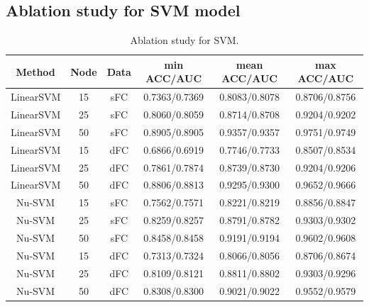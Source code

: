 \documentclass[11pt]{article}
\begin{document}
\subsection{Ablation study for SVM model}

\begin{table}[H]
    \centering
    \begin{tabular}{|c|c|c|c|c|c|}
        \hline
        Method    & Node & Data & min ACC/AUC   & mean ACC/AUC  & max ACC/AUC   \\
        \hline
        LinearSVM & 15   & sFC  & 0.7363/0.7369 & 0.8083/0.8078 & 0.8706/0.8756 \\
        \hline
        LinearSVM & 25   & sFC  & 0.8060/0.8059 & 0.8714/0.8708 & 0.9204/0.9202 \\
        \hline
        LinearSVM & 50   & sFC  & 0.8905/0.8905 & 0.9357/0.9357 & 0.9751/0.9749 \\
        \hline
        LinearSVM & 15   & dFC  & 0.6866/0.6919 & 0.7746/0.7733 & 0.8507/0.8534 \\
        \hline
        LinearSVM & 25   & dFC  & 0.7861/0.7874 & 0.8739/0.8730 & 0.9204/0.9206 \\
        \hline
        LinearSVM & 50   & dFC  & 0.8806/0.8813 & 0.9295/0.9300 & 0.9652/0.9666 \\
        \hline
        Nu-SVM    & 15   & sFC  & 0.7562/0.7571 & 0.8221/0.8219 & 0.8856/0.8847 \\
        \hline
        Nu-SVM    & 25   & sFC  & 0.8259/0.8257 & 0.8791/0.8782 & 0.9303/0.9302 \\
        \hline
        Nu-SVM    & 50   & sFC  & 0.8458/0.8458 & 0.9191/0.9194 & 0.9602/0.9608 \\
        \hline
        Nu-SVM    & 15   & dFC  & 0.7313/0.7324 & 0.8066/0.8056 & 0.8706/0.8674 \\
        \hline
        Nu-SVM    & 25   & dFC  & 0.8109/0.8121 & 0.8811/0.8802 & 0.9303/0.9296 \\
        \hline
        Nu-SVM    & 50   & dFC  & 0.8308/0.8300 & 0.9021/0.9022 & 0.9552/0.9579 \\
        \hline
    \end{tabular}
    \caption{Ablation study for SVM.}
\end{table}
\end{document}

